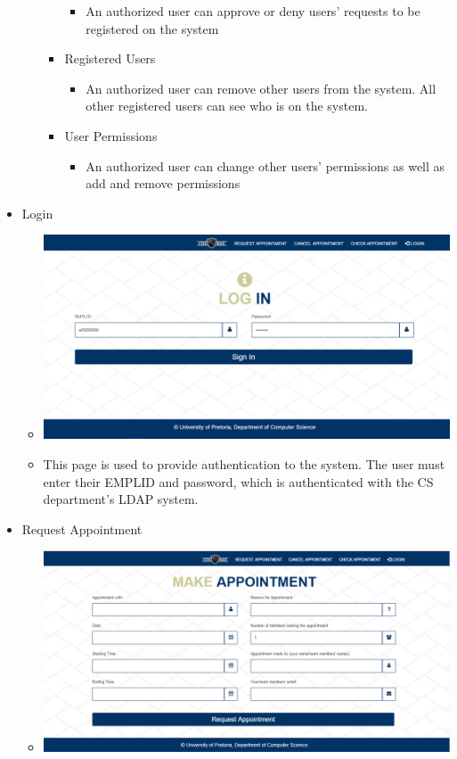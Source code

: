 \begin{itemize}
\begin{itemize}
\begin{itemize}
						\begin{itemize}
							\item An authorized user can approve or deny users' requests to be registered on the system
						\end{itemize}
					\item Registered Users
						\begin{itemize}
							\item An authorized user can remove other users from the system. All other registered users can see who is on the system. 
						\end{itemize}
					\item User Permissions
						\begin{itemize}
							\item An authorized user can change other users' permissions as well as add and remove permissions
						\end{itemize}
				\end{itemize}
			\end{itemize}
		\item Login
			\begin{itemize}
				\item \includegraphics[width=\linewidth]{images/Screenshots/Login.png}
				\item This page is used to provide authentication to the system. The user must enter their EMPLID and password, which is authenticated with the CS department's LDAP system.
			\end{itemize}
		\item Request Appointment
			\begin{itemize}
				\item \includegraphics[width=\linewidth]{images/Screenshots/RequestAppoint.png}

\end{itemize}
\end{itemize}
